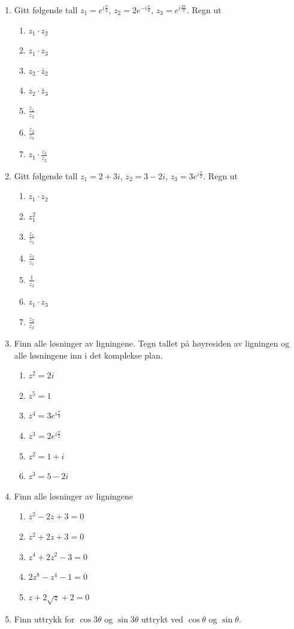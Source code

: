 \documentclass[a4paper,norsk,12pt]{article}
\begin{document}
{\begin{multicols}{2}
\begin{enumerate}
\columnbreak
\item
Gitt følgende tall $z_1 = e^{i\frac{\pi}{2}}$, $z_2 = 2e^{-i\frac{\pi}{6}}$, $z_3 = e^{i\frac{2\pi}{3}}$. Regn ut
\begin{enumerate}[label=\alph*)]
\item
$z_1\cdot z_2$
\item
$z_1 \cdot z_3$
\item
$z_2\cdot\bar{z}_2$
\item
$z_2\cdot \bar{z}_3$
\item
$\frac{z_1}{z_2}$
\item
$\frac{z_2}{\bar{z}_3}$
\item
$z_1\cdot\frac{z_3}{z_2}$
\end{enumerate}
\item
Gitt følgende tall $z_1 = 2+3i$, $z_2=3-2i$, $z_3 = 3e^{i\frac{\pi}{2}}$. Regn ut
\begin{enumerate}[label=\alph*)]
\item
$z_1\cdot z_2$
\item
$z_1^2$
\item
$\frac{z_1}{z_2}$
\item
$\frac{z_2}{z_1}$
\item
$\frac{1}{z_2}$
\item
$z_1\cdot z_3$
\item
$\frac{z_2}{z_3}$
\end{enumerate}
\item
Finn alle løsninger av ligningene. Tegn tallet på høyresiden av ligningen og alle løsningene inn i det komplekse plan.
\begin{enumerate}[label=\alph*)]
\item
$z^2 = 2i$
\item
$z^5 = 1$
\item
$z^4 = 3e^{i\frac{\pi}{3}}$
\item
$z^3 = 2e^{i\frac{\pi}{2}}$
\item
$z^2 = 1+i$
\item
$z^3 = 5-2i$
\end{enumerate}
\item
Finn alle løsninger av ligningene
\begin{enumerate}[label=\alph*)]
\item
$z^2 - 2z + 3 = 0 $
\item
$z^2 + 2z + 3 = 0$
\item
$z^4 +2z^2 - 3 = 0$
\item
$2z^8 - z^4 - 1 = 0$
\item
$z  + 2\sqrt{z}+2 = 0$
\end{enumerate}
\item
Finn uttrykk for $\cos3\theta$ og $\sin3\theta$ uttrykt ved $\cos\theta$ og $\sin\theta$. 
\end{enumerate}
\end{multicols}
}
\end{document}
